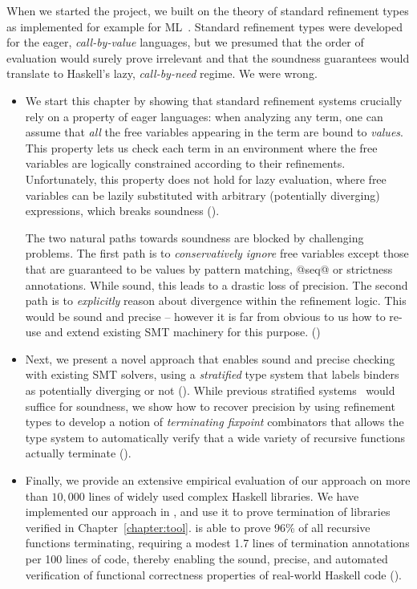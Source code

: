 When we started the \toolname project, 
we built on the theory of standard refinement types 
as implemented for example for ML~\cite{pfenningxi98,GordonRefinement09,LiquidPLDI08}.
%
Standard refinement types were developed for the eager, 
\emph{call-by-value} languages, but we presumed that
the order of evaluation would surely prove irrelevant
and that the soundness guarantees would translate 
to Haskell's lazy, \emph{call-by-need} regime.
%
We were wrong.

\begin{itemize}
\item We start this chapter by showing that standard refinement 
systems crucially rely on a property of eager languages:
%
when analyzing any term, one can assume that \emph{all} the
free variables appearing in the term are bound to \emph{values}.
This property lets us check each term in an environment where 
the free variables are logically constrained according to 
their refinements.
%
Unfortunately, this property does not hold for lazy evaluation, 
where free variables can be lazily substituted with arbitrary 
(potentially diverging) expressions, which breaks 
soundness ().

The two natural paths towards soundness are blocked by challenging problems.
%
The first path is to \emph{conservatively ignore} free variables 
except those that are guaranteed to be values \eg by pattern 
matching, @seq@ or strictness annotations.  
While sound, this leads to a drastic loss of precision. 
%
The second path is to \emph{explicitly} reason about divergence 
within the refinement logic. This would be sound and 
precise -- however it is far from obvious to us how 
to re-use and extend existing SMT machinery for 
this purpose. ()

\item Next, we present a novel approach that
enables sound and precise checking with existing 
SMT solvers, using a \emph{stratified} type system that 
labels binders as potentially diverging or not 
().
%
While previous stratified systems~\cite{ConstableS87}
would suffice for soundness, we show how to recover 
precision by using refinement types to develop a 
notion of \emph{terminating fixpoint} combinators 
that allows the type system to automatically 
verify that a wide variety of recursive functions 
actually terminate ().

\item Finally, we provide an extensive empirical
evaluation of our approach on more than $10,000$ 
lines of widely used complex Haskell libraries.
We have implemented our approach in \toolname, 
and use it to prove termination of 
libraries verified in Chapter~\ref{chapter:tool}.
%
\toolname is able to prove 96\% of 
all recursive functions terminating, requiring a modest 
1.7 lines of termination annotations per 100 lines 
of code, thereby enabling the sound, precise, 
and automated verification of functional 
correctness properties of real-world Haskell code 
().
\end{itemize}
